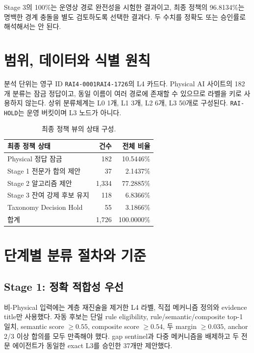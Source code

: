 \documentclass[11pt,a4paper]{article}
\newcommand{\code}[1]{\texttt{#1}}
\begin{document}
Stage 3의 100\%는 운영상 경로 완전성을 시험한 결과이고, 최종 정책의 96.8134\%는
명백한 경계 충돌을 별도 검토하도록 선택한 결과다. 두 수치를 정확도 또는 승인률로
해석해서는 안 된다.

\section{범위, 데이터와 식별 원칙}

분석 단위는 영구 ID \code{RAI4-0001}\textendash{}\code{RAI4-1726}의 L4 카드다. Physical AI
사이트의 182개 분류는 잠금 정답이고, 동일 이름이 여러 경로에 존재할 수 있으므로
라벨을 키로 사용하지 않는다. 상위 분류체계는 L0 1개, L1 3개, L2 6개, L3 50개로
구성된다. \code{RAI-HOLD}는 운영 버킷이며 L3 노드가 아니다.

\begin{table}[H]
\centering
\begin{tabular}{lrr}
\toprule
최종 정책 상태 & 건수 & 전체 비율 \\
\midrule
Physical 정답 잠금 & 182 & 10.5446\% \\
Stage 1 전문가 합의 제안 & 37 & 2.1437\% \\
Stage 2 알고리즘 제안 & 1,334 & 77.2885\% \\
Stage 3 잔여 강제 후보 유지 & 118 & 6.8366\% \\
Taxonomy Decision Hold & 55 & 3.1866\% \\
\midrule
합계 & 1,726 & 100.0000\% \\
\bottomrule
\end{tabular}
\caption{최종 정책 뷰의 상태 구성.}
\end{table}

\section{단계별 분류 절차와 기준}

\subsection{Stage 1: 정확 적합성 우선}

비-Physical 입력에는 계층 재진술을 제거한 L4 라벨, 직접 메커니즘 정의와 evidence
title만 사용했다. 자동 후보는 단일 rule eligibility, rule/semantic/composite top-1
일치, semantic score $\geq0.55$, composite score $\geq0.54$, 두 margin
$\geq0.035$, anchor 2/3 이상 합의를 모두 만족해야 했다. gap sentinel과 다중
메커니즘을 배제하고 두 전문 에이전트가 동일한 exact L3를 승인한 37개만 제안했다.
\end{document}
